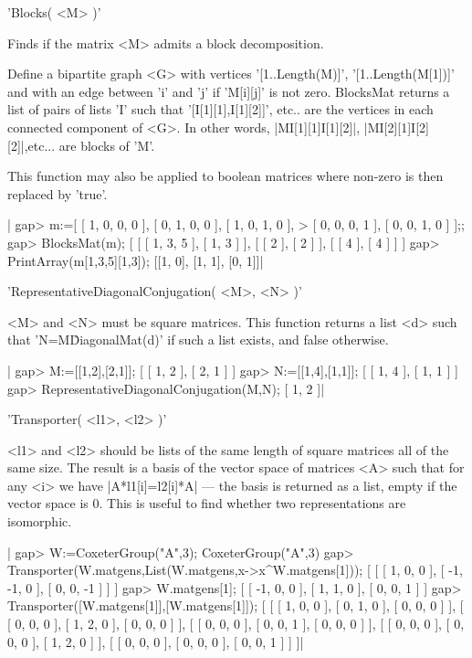 'Blocks( <M> )'

Finds  if the  matrix  <M> admits a block decomposition.

Define    a   bipartite   graph   <G>   with   vertices   '[1..Length(M)]',
'[1..Length(M[1])]'  and with an  edge between 'i'  and 'j' if 'M[i][j]' is
not  zero.  BlocksMat  returns  a  list  of  pairs  of  lists 'I' such that
'[I[1][1],I[1][2]]',  etc.. are the vertices in each connected component of
<G>.  In  other  words, |M{I[1][1]}{I[1][2]}|, |M{I[2][1]}{I[2][2]}|,etc...
are blocks of 'M'.

This function  may also  be applied to boolean matrices
where non-zero is then replaced by 'true'.

|    gap> m:=[ [ 1, 0, 0, 0 ], [ 0, 1, 0, 0 ], [ 1, 0, 1, 0 ],
    >  [ 0, 0, 0, 1 ], [ 0, 0, 1, 0 ] ];;
    gap> BlocksMat(m);
    [ [ [ 1, 3, 5 ], [ 1, 3 ] ], [ [ 2 ], [ 2 ] ], [ [ 4 ], [ 4 ] ] ]
    gap> PrintArray(m{[1,3,5]}{[1,3]});
    [[1, 0],
     [1, 1],
     [0, 1]]|


'RepresentativeDiagonalConjugation( <M>, <N> )'

<M>  and <N> must be  square matrices. This function  returns a list <d>
such  that  'N=M\^DiagonalMat(d)'  if  such  a  list  exists,  and  false
otherwise.

|    gap> M:=[[1,2],[2,1]];
    [ [ 1, 2 ], [ 2, 1 ] ]
    gap> N:=[[1,4],[1,1]];
    [ [ 1, 4 ], [ 1, 1 ] ]
    gap> RepresentativeDiagonalConjugation(M,N);
    [ 1, 2 ]|


'Transporter( <l1>, <l2> )'

<l1>  and <l2> should be lists of the same length of square matrices all of
the  same size. The result  is a basis of  the vector space of matrices <A>
such  that for any <i> we have  |A*l1[i]=l2[i]*A| --- the basis is returned
as  a list, empty if the vector space  is 0. This is useful to find whether
two representations are isomorphic.

|    gap> W:=CoxeterGroup("A",3);
    CoxeterGroup("A",3)
    gap> Transporter(W.matgens,List(W.matgens,x->x^W.matgens[1]));
    [ [ [ 1, 0, 0 ], [ -1, -1, 0 ], [ 0, 0, -1 ] ] ]
    gap> W.matgens[1];
    [ [ -1, 0, 0 ], [ 1, 1, 0 ], [ 0, 0, 1 ] ]
    gap> Transporter([W.matgens[1]],[W.matgens[1]]);
    [ [ [ 1, 0, 0 ], [ 0, 1, 0 ], [ 0, 0, 0 ] ],
      [ [ 0, 0, 0 ], [ 1, 2, 0 ], [ 0, 0, 0 ] ],
      [ [ 0, 0, 0 ], [ 0, 0, 1 ], [ 0, 0, 0 ] ],
      [ [ 0, 0, 0 ], [ 0, 0, 0 ], [ 1, 2, 0 ] ],
      [ [ 0, 0, 0 ], [ 0, 0, 0 ], [ 0, 0, 1 ] ] ]|

